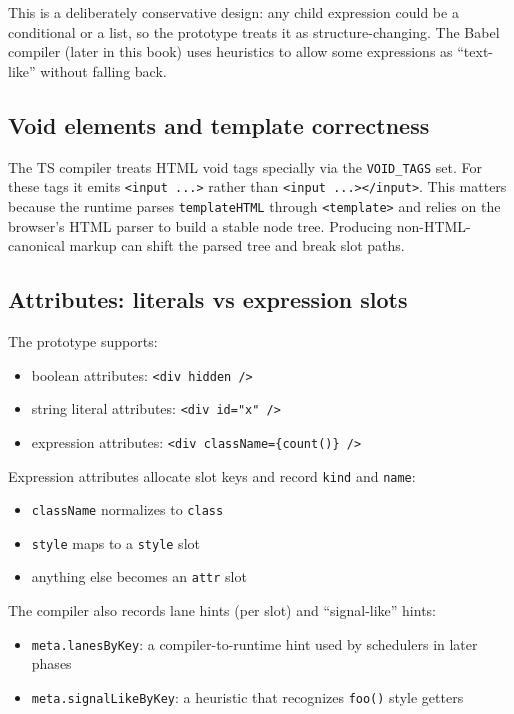 This is a deliberately conservative design: any child expression could be a conditional or a list, so the prototype treats it as structure-changing.
The Babel compiler (later in this book) uses heuristics to allow some expressions as ``text-like'' without falling back.

\subsection{Void elements and template correctness}

The TS compiler treats HTML void tags specially via the \texttt{VOID\_TAGS} set.
For these tags it emits \texttt{<input ...>} rather than \texttt{<input ...></input>}.
This matters because the runtime parses \texttt{templateHTML} through \texttt{<template>} and relies on the browser's HTML parser to build a stable node tree. Producing non-HTML-canonical markup can shift the parsed tree and break slot paths.

\subsection{Attributes: literals vs expression slots}

The prototype supports:

\begin{itemize}
\item boolean attributes: \texttt{<div hidden />}
\item string literal attributes: \texttt{<div id="x" />}
\item expression attributes: \texttt{<div className=\{count()\} />}
\end{itemize}

Expression attributes allocate slot keys and record \texttt{kind} and \texttt{name}:

\begin{itemize}
\item \texttt{className} normalizes to \texttt{class}
\item \texttt{style} maps to a \texttt{style} slot
\item anything else becomes an \texttt{attr} slot
\end{itemize}

The compiler also records lane hints (per slot) and ``signal-like'' hints:

\begin{itemize}
\item \texttt{meta.lanesByKey}: a compiler-to-runtime hint used by schedulers in later phases
\item \texttt{meta.signalLikeByKey}: a heuristic that recognizes \texttt{foo()} style getters
\end{itemize}


